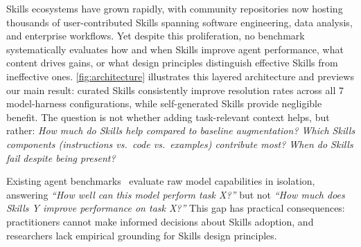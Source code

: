 Skills ecosystems have grown rapidly, with community repositories now hosting thousands of user-contributed Skills spanning software engineering, data analysis, and enterprise workflows. Yet despite this proliferation, no benchmark systematically evaluates how and when Skills improve agent performance, what content drives gains, or what design principles distinguish effective Skills from ineffective ones. \autoref{fig:architecture} illustrates this layered architecture and previews our main result: curated Skills consistently improve resolution rates across all 7 model-harness configurations, while self-generated Skills provide negligible benefit. The question is not whether adding task-relevant context helps, but rather: \textit{How much do Skills help compared to baseline augmentation? Which Skills components (instructions vs.\ code vs.\ examples) contribute most? When do Skills fail despite being present?}


Existing agent benchmarks~\citep{liu2023agentbench, merrill2026terminalbenchbenchmarkingagentshard, jimenez2024swebench, zhou2024webarena, xie2024osworld, koh2024visualwebarena, trivedi2024appworld, yang2023intercode, chan2025mlebench, zhuo2025bigcodebench} evaluate raw model capabilities in isolation, answering \textit{``How well can this model perform task X?''} but not \textit{``How much does Skills Y improve performance on task X?''} This gap has practical consequences: practitioners cannot make informed decisions about Skills adoption, and researchers lack empirical grounding for Skills design principles.

